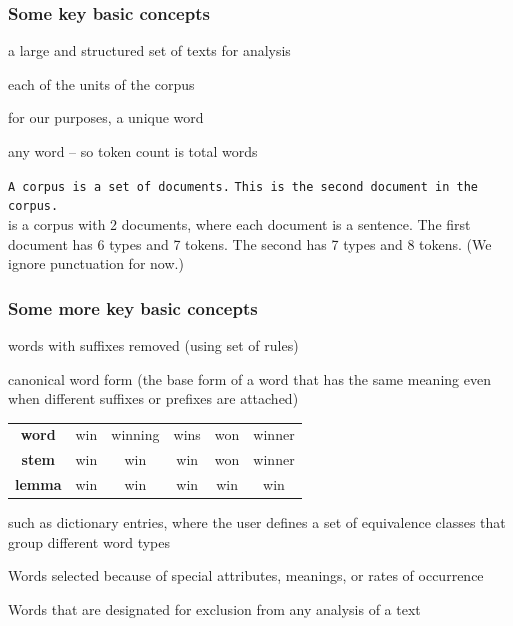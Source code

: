 \documentclass[notes=hide]{beamer}
\begin{document}
\begin{frame}[fragile]
	\frametitle{Some key basic concepts}
	\begin{description}[<+->]
		\item[(text) corpus] a large and structured set of texts for analysis
		\item[document] each of the units of the corpus
		\item[types] for our purposes, a unique word
		\item[tokens] any word -- so token count is total words
		\vspace{.20cm}
		\item[e.g.]
		\verb|A corpus is a set of documents.|
		\verb|This is the second document in the corpus.| \\
		\vspace{.20cm}
		\small{is a corpus with 2 documents, where each document is a sentence. The first document has 6 types and 7 tokens. The second has 7 types and 8 tokens. (We ignore punctuation for now.)}
		
	\end{description}
\end{frame}


\begin{frame}
	\frametitle{Some more key basic concepts}
	\begin{description}[<+->]
		\item[stems] words with suffixes removed (using set of rules)
		\item[lemmas] canonical word form (the base form of a word that has the same meaning even
		when different suffixes or prefixes are attached)\\
		\vspace{.20cm}
		\begin{tabular}{cccccc}
			\hline
			\textbf{word} &  win & winning & wins & won & winner \\
			\textbf{stem} & win & win & win & won & winner \\
			\textbf{lemma} & win & win & win & win & win \\
			\hline
		\end{tabular}
		\vspace{.20cm}
		\item[keys] such as dictionary entries, where the user
		defines a set of equivalence classes that group different word types
		\item[``key'' words] Words selected because of special
		attributes, meanings, or rates of occurrence
		\item[stop words] Words that are designated for exclusion
		from any analysis of a text    
	\end{description}
\end{frame}
\end{document}
